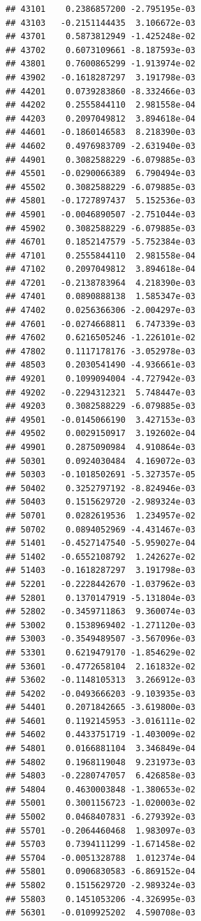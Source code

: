 \begin{frame}[fragile]
\begin{verbatim}
## 43101    0.2386857200 -2.795195e-03
## 43103   -0.2151144435  3.106672e-03
## 43701    0.5873812949 -1.425248e-02
## 43702    0.6073109661 -8.187593e-03
## 43801    0.7600865299 -1.913974e-02
## 43902   -0.1618287297  3.191798e-03
## 44201    0.0739283860 -8.332466e-03
## 44202    0.2555844110  2.981558e-04
## 44203    0.2097049812  3.894618e-04
## 44601   -0.1860146583  8.218390e-03
## 44602    0.4976983709 -2.631940e-03
## 44901    0.3082588229 -6.079885e-03
## 45501   -0.0290066389  6.790494e-03
## 45502    0.3082588229 -6.079885e-03
## 45801   -0.1727897437  5.152536e-03
## 45901   -0.0046890507 -2.751044e-03
## 45902    0.3082588229 -6.079885e-03
## 46701    0.1852147579 -5.752384e-03
## 47101    0.2555844110  2.981558e-04
## 47102    0.2097049812  3.894618e-04
## 47201   -0.2138783964  4.218390e-03
## 47401    0.0890888138  1.585347e-03
## 47402    0.0256366306 -2.004297e-03
## 47601   -0.0274668811  6.747339e-03
## 47602    0.6216505246 -1.226101e-02
## 47802    0.1117178176 -3.052978e-03
## 48503    0.2030541490 -4.936661e-03
## 49201    0.1099094004 -4.727942e-03
## 49202   -0.2294312321  5.748447e-03
## 49203    0.3082588229 -6.079885e-03
## 49501   -0.0145066190  3.427153e-03
## 49502    0.0029150917  3.192602e-04
## 49901    0.2875090984  4.910864e-03
## 50301    0.0924030484  4.169072e-03
## 50303   -0.1018502691 -5.327357e-05
## 50402    0.3252797192 -8.824946e-03
## 50403    0.1515629720 -2.989324e-03
## 50701    0.0282619536  1.234957e-02
## 50702    0.0894052969 -4.431467e-03
## 51401   -0.4527147540 -5.959027e-04
## 51402   -0.6552108792  1.242627e-02
## 51403   -0.1618287297  3.191798e-03
## 52201   -0.2228442670 -1.037962e-03
## 52801    0.1370147919 -5.131804e-03
## 52802   -0.3459711863  9.360074e-03
## 53002    0.1538969402 -1.271120e-03
## 53003   -0.3549489507 -3.567096e-03
## 53301    0.6219479170 -1.854629e-02
## 53601   -0.4772658104  2.161832e-02
## 53602   -0.1148105313  3.266912e-03
## 54202   -0.0493666203 -9.103935e-03
## 54401    0.2071842665 -3.619800e-03
## 54601    0.1192145953 -3.016111e-02
## 54602    0.4433751719 -1.403009e-02
## 54801    0.0166881104  3.346849e-04
## 54802    0.1968119048  9.231973e-03
## 54803   -0.2280747057  6.426858e-03
## 54804    0.4630003848 -1.380653e-02
## 55001    0.3001156723 -1.020003e-02
## 55002    0.0468407831 -6.279392e-03
## 55701   -0.2064460468  1.983097e-03
## 55703    0.7394111299 -1.671458e-02
## 55704   -0.0051328788  1.012374e-04
## 55801    0.0906830583 -6.869152e-04
## 55802    0.1515629720 -2.989324e-03
## 55803    0.1451053206 -4.326995e-03
## 56301   -0.0109925202  4.590708e-03

\end{verbatim}
\end{frame}
